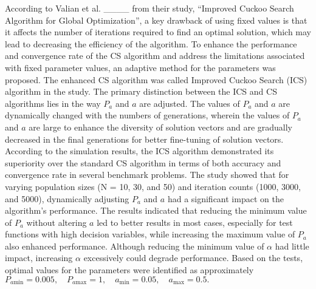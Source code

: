 According to Valian et al. ____ from their study, “Improved Cuckoo Search Algorithm for Global Optimization”, a key drawback of using fixed values is that it affects the number of iterations required to find an optimal solution, which may lead to decreasing the efficiency of the algorithm. To enhance the performance and convergence rate of the CS algorithm and address the limitations associated with fixed parameter values, an adaptive method for the parameters was proposed. The enhanced CS algorithm was called Improved Cuckoo Search (ICS) algorithm in the study. The primary distinction between the ICS and CS algorithms lies in the way $P_a$ and $a$ are adjusted. The values of $P_a$ and $a$ are dynamically changed with the numbers of generations, wherein the values of $P_a$ and $a$ are large to enhance the diversity of solution vectors and are gradually decreased in the final generations for better fine-tuning of solution vectors. According to the simulation results, the ICS algorithm demonstrated its superiority over the standard CS algorithm in terms of both accuracy and convergence rate in several benchmark problems. The study showed that for varying population sizes (N = 10, 30, and 50) and iteration counts (1000, 3000, and 5000), dynamically adjusting $P_a$ and $a$ had a significant impact on the algorithm's performance. The results indicated that reducing the minimum value of $P_a$ without altering $a$ led to better results in most cases, especially for test functions with high decision variables, while increasing the maximum value of $P_a$ also enhanced performance. Although reducing the minimum value of $\alpha$ had little impact, increasing $\alpha$ excessively could degrade performance. Based on the tests, optimal values for the parameters were identified as approximately  
$P_{a\text{min}} = 0.005, \quad P_{a\text{max}} = 1, \quad a_{\text{min}} = 0.05, \quad a_{\text{max}} = 0.5.$


